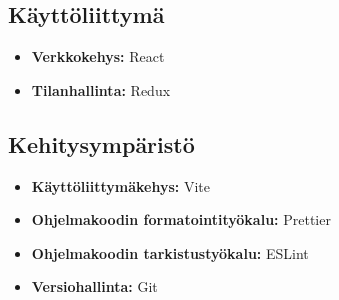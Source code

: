 \documentclass[11pt,a4paper]{article}
\begin{document}
\subsection{Käyttöliittymä}

\begin{itemize}
	\item \textbf{Verkkokehys:} React
	\item \textbf{Tilanhallinta:} Redux
\end{itemize}

\subsection{Kehitysympäristö}

\begin{itemize}
	\item \textbf{Käyttöliittymäkehys:} Vite
	\item \textbf{Ohjelmakoodin formatointityökalu:} Prettier
	\item \textbf{Ohjelmakoodin tarkistustyökalu:} ESLint
	\item \textbf{Versiohallinta:} Git
\end{itemize}
\end{document}
